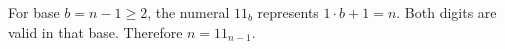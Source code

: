 For base $b=n-1\ge2$, the numeral $11_b$ represents $1\cdot b+1=n$. Both digits are valid in that base. Therefore $\boxed{n=11_{n-1}}$.
